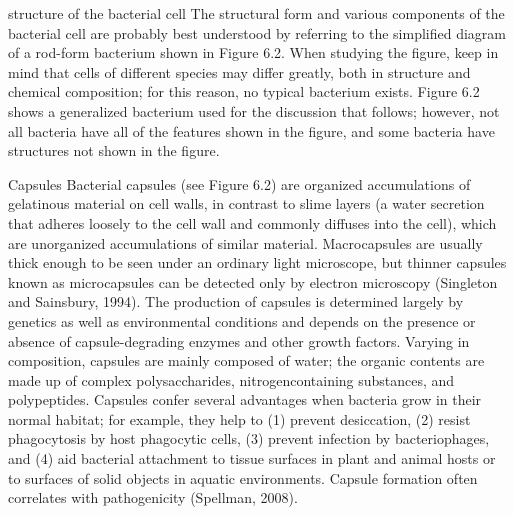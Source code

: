 \documentclass{article}
\begin{document}
structure of the bacterial cell The structural form and various
components of the bacterial cell are probably best understood by
referring to the simplified diagram of a rod-form bacterium shown in
Figure 6.2. When studying the figure, keep in mind that cells of
different species may differ greatly, both in structure and chemical
composition; for this reason, no typical bacterium exists. Figure 6.2
shows a generalized bacterium used for the discussion that follows;
however, not all bacteria have all of the features shown in the figure,
and some bacteria have structures not shown in the figure.

Capsules Bacterial capsules (see Figure 6.2) are organized accumulations
of gelatinous material on cell walls, in contrast to slime layers (a
water secretion that adheres loosely to the cell wall and commonly
diffuses into the cell), which are unorganized accumulations of similar
material. Macrocapsules are usually thick enough to be seen under an
ordinary light microscope, but thinner capsules known as microcapsules
can be detected only by electron microscopy (Singleton and Sainsbury,
1994). The production of capsules is determined largely by genetics as
well as environmental conditions and depends on the presence or absence
of capsule-degrading enzymes and other growth factors. Varying in
composition, capsules are mainly composed of water; the organic contents
are made up of complex polysaccharides, nitrogencontaining substances,
and polypeptides. Capsules confer several advantages when bacteria grow
in their normal habitat; for example, they help to (1) prevent
desiccation, (2) resist phagocytosis by host phagocytic cells, (3)
prevent infection by bacteriophages, and (4) aid bacterial attachment to
tissue surfaces in plant and animal hosts or to surfaces of solid
objects in aquatic environments. Capsule formation often correlates with
pathogenicity (Spellman, 2008).
\end{document}
